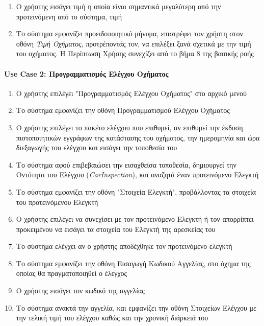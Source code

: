 \documentclass{../ol-softwaremanual}
\begin{document}
	\begin{enumerate}
		\item Ο χρήστης εισάγει τιμή η οποία είναι σημαντικά μεγαλύτερη από την προτεινόμενη από το σύστημα, τιμή
		\item Το σύστημα εμφανίζει προειδοποιητικό μήνυμα, επιστρέφει τον χρήστη στον οθόνη \textit{Τιμή Οχήματος}, προτρέποντάς τον, να επιλέξει ξανά σχετικά με την τιμή του οχήματος. Η Περίπτωση Χρήσης συνεχίζει από το βήμα 8 της βασικής ροής
	\end{enumerate}
	
	
	\paragraph{\en Use Case 2: \gr Προγραμματισμός Ελέγχου Οχήματος}
	
	\begin{enumerate}
		\item Ο χρήστης επιλέγει \en"\gr Προγραμματισμός Ελέγχου Οχήματος\en" \gr στο αρχικό μενού
		\item Το σύστημα εμφανίζει την οθόνη Προγραμματισμού Ελέγχου Οχήματος
		\item Ο χρήστης επιλέγει το πακέτο ελέγχου που επιθυμεί, αν επιθυμεί την έκδοση πιστοποιητικών εγγράφων της κατάστασης του οχήματος, την ημερομηνία και ώρα διεξαγωγής του ελέγχου και εισάγει την τοποθεσία του
		\item Το σύστημα αφού επιβεβαιώσει την εισαχθείσα τοποθεσία, δημιουργεί την Οντότητα του Ελέγχου (\en \textit{CarInspection}\gr),  και αναζητά έναν προτεινόμενο Ελεγκτή
		\item Το σύστημα εμφανίζει την οθόνη \en"\gr Στοιχεία Ελεγκτή\en"\gr, προβάλλοντας τα στοιχεία του προτεινόμενου Ελεγκτή		
		\item Ο χρήστης επιλέγει να συνεχίσει με τον προτεινόμενο Ελεγκτή ή τον απορρίπτει προκειμένου να εισάγει τα στοιχεία του Ελεγκτή της αρεσκείας του
		\item Το σύστημα ελέγχει αν ο χρήστης αποδέχθηκε τον προτεινόμενο ελεγκτή
		\item Το σύστημα εμφανίζει την οθόνη Εισαγωγή Κωδικού Αγγελίας, στο όχημα της οποίας θα πραγματοποιηθεί ο έλεγχος		
		\item Ο χρήστης εισάγει τον κωδικό της αγγελίας
		\item Το σύστημα ανακτά την αγγελία,  και εμφανίζει την οθόνη Στοιχείων Ελέγχου με την τελική τιμή του ελέγχου καθώς και την χρονική διάρκειά του

\end{enumerate}
\end{document}

